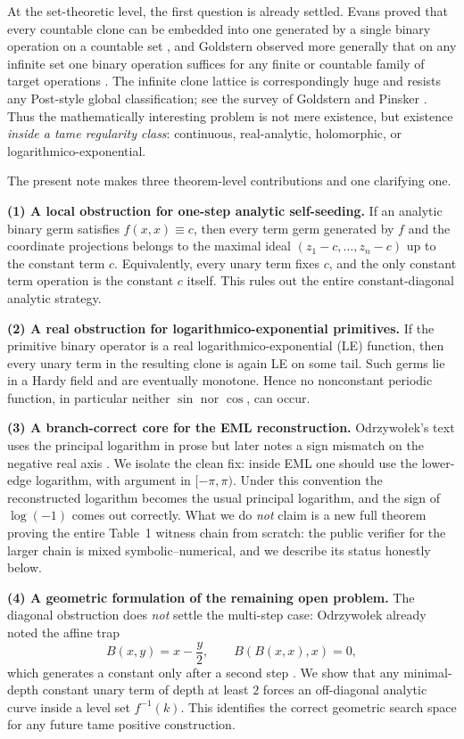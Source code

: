 \documentclass[12pt]{amsart}
\theoremstyle{remark}
\begin{document}
At the set-theoretic level, the first question is already settled.  Evans proved that every countable clone can be embedded into one generated by a single binary operation on a countable set \cite{Evans1989}, and Goldstern observed more generally that on any infinite set one binary operation suffices for any finite or countable family of target operations \cite{Goldstern2010}.  The infinite clone lattice is correspondingly huge and resists any Post-style global classification; see the survey of Goldstern and Pinsker \cite{GoldsternPinsker2008}.  Thus the mathematically interesting problem is not mere existence, but existence \emph{inside a tame regularity class}: continuous, real-analytic, holomorphic, or logarithmico-exponential.

The present note makes three theorem-level contributions and one clarifying one.

\smallskip
\noindent\textbf{(1) A local obstruction for one-step analytic self-seeding.}
If an analytic binary germ satisfies $f(x,x)\equiv c$, then every term germ generated by $f$ and the coordinate projections belongs to the maximal ideal $(z_1-c,\dots,z_n-c)$ up to the constant term $c$.  Equivalently, every unary term fixes $c$, and the only constant term operation is the constant $c$ itself.  This rules out the entire constant-diagonal analytic strategy.

\smallskip
\noindent\textbf{(2) A real obstruction for logarithmico-exponential primitives.}
If the primitive binary operator is a real logarithmico-exponential (LE) function, then every unary term in the resulting clone is again LE on some tail.  Such germs lie in a Hardy field and are eventually monotone.  Hence no nonconstant periodic function, in particular neither $\sin$ nor $\cos$, can occur.

\smallskip
\noindent\textbf{(3) A branch-correct core for the EML reconstruction.}
Odrzywo\l{}ek's text uses the principal logarithm in prose but later notes a sign mismatch on the negative real axis \cite{Odrzywolek2026}.  We isolate the clean fix: inside EML one should use the lower-edge logarithm, with argument in $[-\pi,\pi)$.  Under this convention the reconstructed logarithm becomes the usual principal logarithm, and the sign of $\log(-1)$ comes out correctly.  What we do \emph{not} claim is a new full theorem proving the entire Table~1 witness chain from scratch: the public verifier for the larger chain is mixed symbolic--numerical, and we describe its status honestly below.

\smallskip
\noindent\textbf{(4) A geometric formulation of the remaining open problem.}
The diagonal obstruction does \emph{not} settle the multi-step case: Odrzywo\l{}ek already noted the affine trap
\[
B(x,y)=x-\frac y2,
\qquad B(B(x,x),x)=0,
\]
which generates a constant only after a second step \cite{Odrzywolek2026}.  We show that any minimal-depth constant unary term of depth at least $2$ forces an off-diagonal analytic curve inside a level set $f^{-1}(k)$.  This identifies the correct geometric search space for any future tame positive construction.
\end{document}
